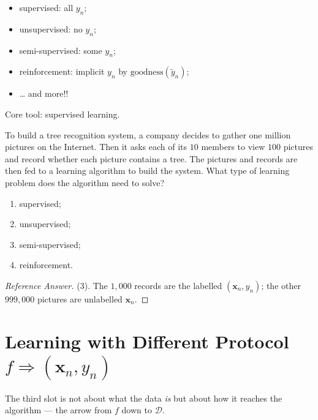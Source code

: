 \begin{note}
    \hfill
    \begin{itemize}
        \item supervised: all \(y_n\);
        \item unsupervised: no \(y_n\);
        \item semi-supervised: some \(y_n\);
        \item reinforcement: implicit \(y_n\) by
            \(\text{goodness}(\tilde{y}_n)\);
        \item \ldots{} and more!!
    \end{itemize}
\end{note}

\begin{moral}
    Core tool: supervised learning.
\end{moral}

\begin{exercise}
    To build a tree recognition system, a company decides to gather one million
    pictures on the Internet. Then it asks each of its \(10\) members to view
    \(100\) pictures and record whether each picture contains a tree. The
    pictures and records are then fed to a learning algorithm to build the
    system. What type of learning problem does the algorithm need to solve?
    \begin{enumerate}[(1)]
        \item supervised;
        \item unsupervised;
        \item semi-supervised;
        \item reinforcement.
    \end{enumerate}
\end{exercise}

\begin{proof}[Reference Answer]
    (3). The \(1{,}000\) records are the labelled \((\bm{x}_n, y_n)\); the other
    \(999{,}000\) pictures are unlabelled \(\bm{x}_n\).
\end{proof}

\section{Learning with Different Protocol
\texorpdfstring{\(f \Rightarrow (\bm{x}_n, y_n)\)}{f => (xn,yn)}}\label{sec:protocol}


The third slot is not about what the data \emph{is} but about how it reaches the
algorithm --- the arrow from \(f\) down to \(\mathcal{D}\).

